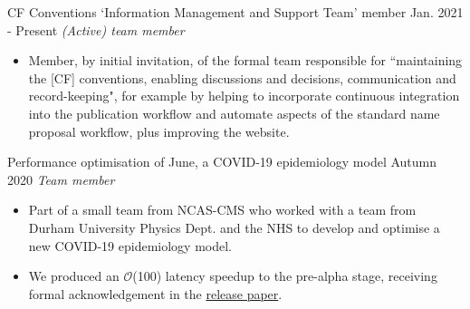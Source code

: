 \begin{projects}
\projecta
	{CF Conventions `Information Management and Support Team' member \lbrack\href{https://cfconventions.org/governance.html}{\small{\websiteSymbol}}\rbrack}{Jan. 2021 - Present}
	{
	    \textit{(Active) team member}
	}
	{\begin{itemize}
     \item Member, by initial invitation, of the formal team responsible for ``maintaining the [CF] conventions, enabling discussions and decisions, communication and record-keeping", for example by helping to incorporate continuous integration into the publication workflow and automate aspects of the standard name proposal workflow, plus improving the website.
     \end{itemize}}

\projecta
	{Performance optimisation of June, a COVID-19 epidemiology model
    \lbrack\href{https://github.com/IDAS-Durham/JUNE}{\small{\githubSymbol}}\rbrack}{Autumn 2020}
	{
	    \textit{Team member}
	}
	{\begin{itemize}
     \item Part of a small team from NCAS-CMS who worked with a team from Durham University Physics Dept. and the NHS to develop and optimise a new COVID-19 epidemiology model.
     \item We produced an $\mathcal{O}$(100) latency speedup to the pre-alpha stage, receiving formal acknowledgement in the \href{https://royalsocietypublishing.org/doi/10.1098/rsos.210506}{release paper}.
     \end{itemize}}

\end{projects}
